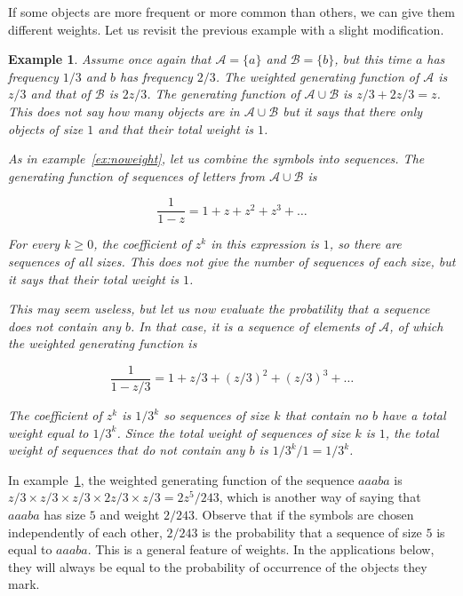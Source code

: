 \documentclass{article}
\newtheorem{example}{Example}
\begin{document}
If some objects are more frequent or more common than others, we can give
them different weights. Let us revisit the previous example with a slight
modification.

\begin{example}
\label{ex:wweights}
Assume once again that $\mathcal{A} = \{a\}$ and $\mathcal{B} = \{b\}$,
but this time $a$ has frequency $1/3$ and $b$ has frequency $2/3$. The
weighted generating function of $\mathcal{A}$ is $z/3$ and that of
$\mathcal{B}$ is $2z/3$. The generating function of $\mathcal{A} \cup
\mathcal{B}$ is $z/3 + 2z/3 = z$. This does not say how many objects are
in $\mathcal{A} \cup \mathcal{B}$ but it says that there only objects of
size $1$ and that their total weight is $1$.

As in example~\ref{ex:noweight}, let us combine the symbols into
sequences. The generating function of sequences of letters from
$\mathcal{A} \cup \mathcal{B}$ is

\begin{equation*}
\frac{1}{1-z} = 1 + z + z^2 + z^3 + \ldots
\end{equation*}

For every $k \geq 0$, the coefficient of $z^k$ in this expression is $1$,
so there are sequences of all sizes. This does not give the number of
sequences of each size, but it says that their total weight is $1$.

This may seem useless, but let us now evaluate the probatility that a
sequence does not contain any $b$. In that case, it is a sequence of
elements of $\mathcal{A}$, of which the weighted generating function is

\begin{equation*}
\frac{1}{1-z/3} = 1 + z/3 + (z/3)^2 + (z/3)^3 + \ldots
\end{equation*}

The coefficient of $z^k$ is $1/3^k$ so sequences of size $k$ that contain
no $b$ have a total weight equal to $1/3^k$. Since the total weight of
sequences of size $k$ is $1$, the total weight of sequences that do not
contain any $b$ is $1/3^k \big/ 1 = 1/3^k$.
\end{example}

In example~\ref{ex:wweights}, the weighted generating function of the
sequence $aaaba$ is $z/3 \times z/3 \times z/3 \times 2z/3 \times z/3 =
2z^5/243$, which is another way of saying that $aaaba$ has size $5$ and
weight $2/243$. Observe that if the symbols are chosen independently of
each other, $2/243$ is the probability that a sequence of size $5$ is
equal to $aaaba$. This is a general feature of weights. In the
applications below, they will always be equal to the probability
of occurrence of the objects they mark.
\end{document}
